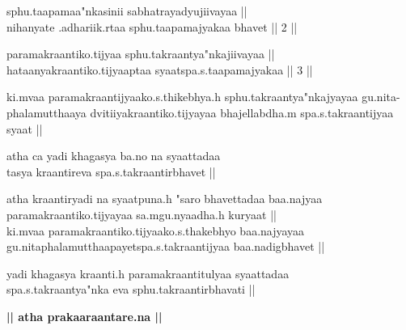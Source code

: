 {sphu.taapamaa"nkasi{}nii sabhatrayadyujiivayaa || \\
nihanyate .adhariik.rtaa sphu.taapamajyakaa bhavet || 2 || %
\bigskip

paramakraantiko.tijyaa sphu.takraantya"nkajiivayaa || \\
hataanya\-kraantiko.tijyaaptaa syaatspa.s.taapamajyakaa || 3 || 

ki.mvaa paramakraantijyaako.s.thikebhya.h sphu.takraantya"nkajyayaa gu.nita-\\phalamutthaaya dvitiiyakraantiko.tijyayaa bhajellabdha.m spa.s.takraantijyaa syaat || 

atha ca yadi khagasya  ba.no na syaattadaa \\
tasya kraantireva spa.s.takraantirbhavet ||  
\newpage

atha kraantiryadi na syaatpuna.h "saro bhavettadaa baa.najyaa \\ paramakraantiko.tijyayaa sa.mgu.nyaadha.h kuryaat || \\
ki.mvaa paramakraantiko.tijyaako.s.thakebhyo baa.najyayaa \\ gu.nitaphalamutthaapayetspa.s.takraantijyaa baa.nadigbhavet || 

yadi khagasya kraanti.h paramakraantitulyaa syaattadaa\\ spa.s.takraantya"nka eva sphu.takraantirbhavati || 
\bigskip

{\bfseries || atha prakaaraantare.na ||}
\medskip

}
